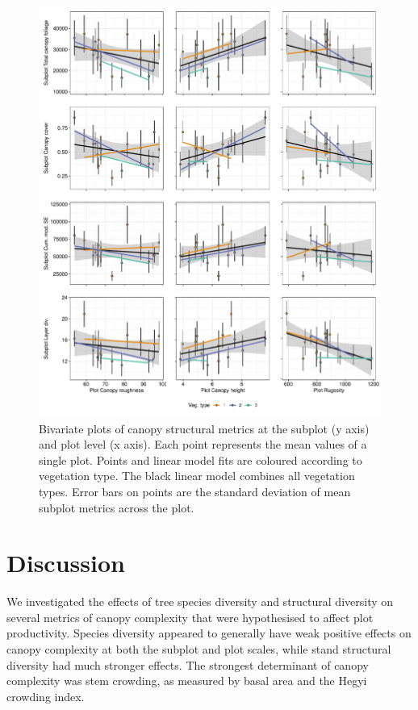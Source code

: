 \documentclass[11pt,a4paper]{article}
\begin{document}
\begin{figure}
	\includegraphics[width=\linewidth]{plot_subplot_bivar}
	\caption{Bivariate plots of canopy structural metrics at the subplot (y axis) and plot level (x axis). Each point represents the mean values of a single plot. Points and linear model fits are coloured according to vegetation type. The black linear model combines all vegetation types. Error bars on points are the standard deviation of mean subplot metrics across the plot.}
	\label{plot_subplot_bivar}
\end{figure}

\section{Discussion}

We investigated the effects of tree species diversity and structural diversity on several metrics of canopy complexity that were hypothesised to affect plot productivity. Species diversity appeared to generally have weak positive effects on canopy complexity at both the subplot and plot scales, while stand structural diversity had much stronger effects. The strongest determinant of canopy complexity was stem crowding, as measured by basal area and the Hegyi crowding index.
\end{document}
